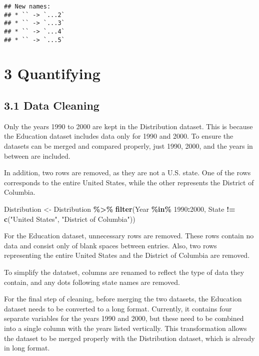 \documentclass[
]{article}
\newenvironment{Shaded}{\begin{snugshade}}{\end{snugshade}}
\newcommand{\DecValTok}[1]{\textcolor[rgb]{0.00,0.00,0.81}{#1}}
\newcommand{\FunctionTok}[1]{\textcolor[rgb]{0.13,0.29,0.53}{\textbf{#1}}}
\newcommand{\NormalTok}[1]{#1}
\newcommand{\OtherTok}[1]{\textcolor[rgb]{0.56,0.35,0.01}{#1}}
\newcommand{\SpecialCharTok}[1]{\textcolor[rgb]{0.81,0.36,0.00}{\textbf{#1}}}
\newcommand{\StringTok}[1]{\textcolor[rgb]{0.31,0.60,0.02}{#1}}
\begin{document}
\begin{verbatim}
## New names:
## * `` -> `...2`
## * `` -> `...3`
## * `` -> `...4`
## * `` -> `...5`
\end{verbatim}

\section{3 Quantifying}\label{quantifying}

\subsection{3.1 Data Cleaning}\label{data-cleaning}

Only the years 1990 to 2000 are kept in the Distribution dataset. This
is because the Education dataset includes data only for 1990 and 2000.
To ensure the datasets can be merged and compared properly, just 1990,
2000, and the years in between are included.

In addition, two rows are removed, as they are not a U.S. state. One of
the rows corresponds to the entire United States, while the other
represents the District of Columbia.

\begin{Shaded}
\begin{Highlighting}[]
\NormalTok{Distribution }\OtherTok{\textless{}{-}}\NormalTok{ Distribution }\SpecialCharTok{\%\textgreater{}\%}
  \FunctionTok{filter}\NormalTok{(Year }\SpecialCharTok{\%in\%} \DecValTok{1990}\SpecialCharTok{:}\DecValTok{2000}\NormalTok{, }
\NormalTok{         State }\SpecialCharTok{!=} \FunctionTok{c}\NormalTok{(}\StringTok{"United States"}\NormalTok{, }\StringTok{"District of Columbia"}\NormalTok{))}
\end{Highlighting}
\end{Shaded}

For the Education dataset, unnecessary rows are removed. These rows
contain no data and consist only of blank spaces between entries. Also,
two rows representing the entire United States and the District of
Columbia are removed.

To simplify the datatset, columns are renamed to reflect the type of
data they contain, and any dots following state names are removed.

For the final step of cleaning, before merging the two datasets, the
Education dataset needs to be converted to a long format. Currently, it
contains four separate variables for the years 1990 and 2000, but these
need to be combined into a single column with the years listed
vertically. This transformation allows the dataset to be merged properly
with the Distribution dataset, which is already in long format.
\end{document}
